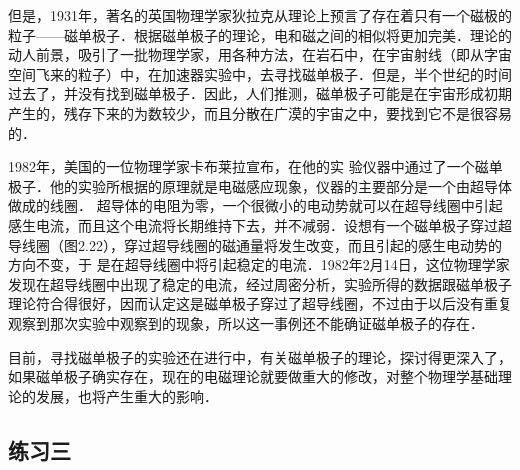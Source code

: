 但是，1931年，著名的英国物理学家狄拉克从理论上预言了存在着只有一个磁极的粒子——磁单极子．根据磁单极子的理论，电和磁之间的相似将更加完美．理论的动人前景，吸引了一批物理学家，用各种方法，在岩石中，在宇宙射线（即从字宙空间飞来的粒子）中，在加速器实验中，去寻找磁单极子．但是，半个世纪的时间过去了，并没有找到磁单极子．因此，人们推测，磁单极子可能是在宇宙形成初期产生的，残存下来的为数较少，而且分散在广漠的宇宙之中，要找到它不是很容易的．
\begin{figure}[htp]\centering
{}
\caption{}
\end{figure}

1982年，美国的一位物理学家卡布莱拉宣布，在他的实
验仪器中通过了一个磁单极子．他的实验所根据的原理就是电磁感应现象，仪器的主要部分是一个由超导体做成的线圈．
超导体的电阻为零，一个很微小的电动势就可以在超导线圈中引起感生电流，而且这个电流将长期维持下去，并不减弱．设想有一个磁单极子穿过超导线圈（图2.22），穿过超导线圈的磁通量将发生改变，而且引起的感生电动势的方向不变，于
是在超导线圈中将引起稳定的电流．1982年2月14日，这位物理学家发现在超导线圈中出现了稳定的电流，经过周密分析，实验所得的数据跟磁单极子理论符合得很好，因而认定这是磁单极子穿过了超导线圈，不过由于以后没有重复观察到那次实验中观察到的现象，所以这一事例还不能确证磁单极子的存在．

目前，寻找磁单极子的实验还在进行中，有关磁单极子的理论，探讨得更深入了，如果磁单极子确实存在，现在的电磁理论就要做重大的修改，对整个物理学基础理论的发展，也将产生重大的影响．

\subsection*{练习三}


